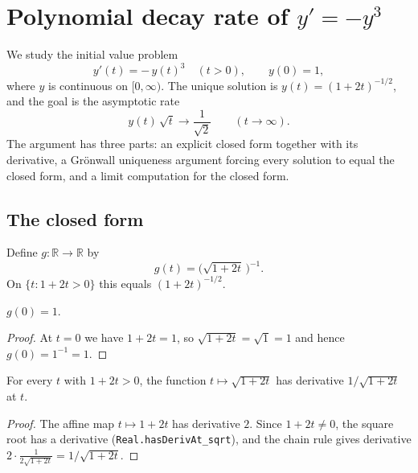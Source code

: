 


\section{Polynomial decay rate of $y' = -y^3$}

We study the initial value problem
\[
    y'(t) = -\,y(t)^3 \quad (t > 0), \qquad y(0) = 1,
\]
where $y$ is continuous on $[0,\infty)$. The unique solution is
$y(t) = (1+2t)^{-1/2}$, and the goal is the asymptotic rate
\[
    y(t)\,\sqrt{t} \longrightarrow \frac{1}{\sqrt 2} \qquad (t \to \infty).
\]
The argument has three parts: an explicit closed form together with its
derivative, a Gr\"onwall uniqueness argument forcing every solution to equal the
closed form, and a limit computation for the closed form.

\subsection{The closed form}

\begin{definition}
    \label{def:closed-form}
    \leanok
    Define $g : \mathbb{R} \to \mathbb{R}$ by
    \[
        g(t) = \bigl(\sqrt{1 + 2t}\,\bigr)^{-1}.
    \]
    On $\{t : 1 + 2t > 0\}$ this equals $(1+2t)^{-1/2}$.
\end{definition}

\begin{lemma}
    \label{lem:closed-form-zero}
    \leanok
    $g(0) = 1$.
\end{lemma}
\begin{proof}
    At $t = 0$ we have $1 + 2t = 1$, so $\sqrt{1+2t} = \sqrt 1 = 1$ and hence
    $g(0) = 1^{-1} = 1$.
\end{proof}

\begin{lemma}
    \label{lem:sqrt-affine-deriv}
    \leanok
    For every $t$ with $1 + 2t > 0$, the function $t \mapsto \sqrt{1+2t}$ has
    derivative $1/\sqrt{1+2t}$ at $t$.
\end{lemma}
\begin{proof}
    The affine map $t \mapsto 1 + 2t$ has derivative $2$. Since $1 + 2t \neq 0$,
    the square root has a derivative (\texttt{Real.hasDerivAt\_sqrt}), and the
    chain rule gives derivative $2 \cdot \frac{1}{2\sqrt{1+2t}} = 1/\sqrt{1+2t}$.
\end{proof}

